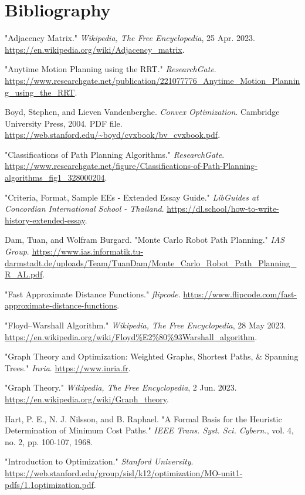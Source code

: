\documentclass[12pt]{article}
\begin{document}
\section{Bibliography}
\begin{enumerate}[label={[\arabic*]}]
    \item "Adjacency Matrix." \textit{Wikipedia, The Free Encyclopedia}, 25 Apr. 2023. \url{https://en.wikipedia.org/wiki/Adjacency_matrix}.
    \item "Anytime Motion Planning using the RRT." \textit{ResearchGate}. \url{https://www.researchgate.net/publication/221077776_Anytime_Motion_Planning_using_the_RRT}.
    \item Boyd, Stephen, and Lieven Vandenberghe. \textit{Convex Optimization}. Cambridge University Press, 2004. PDF file. \url{https://web.stanford.edu/~boyd/cvxbook/bv_cvxbook.pdf}.
    \item "Classifications of Path Planning Algorithms." \textit{ResearchGate}. \url{https://www.researchgate.net/figure/Classifications-of-Path-Planning-algorithms_fig1_328000204}.
    \item "Criteria, Format, Sample EEs - Extended Essay Guide." \textit{LibGuides at Concordian International School - Thailand}. \url{https://dl.school/how-to-write-history-extended-essay}.
    \item Dam, Tuan, and Wolfram Burgard. "Monte Carlo Robot Path Planning." \textit{IAS Group}. \url{https://www.ias.informatik.tu-darmstadt.de/uploads/Team/TuanDam/Monte_Carlo_Robot_Path_Planning_R_AL.pdf}.
    \item "Fast Approximate Distance Functions." \textit{flipcode}. \url{https://www.flipcode.com/fast-approximate-distance-functions}.
    \item "Floyd–Warshall Algorithm." \textit{Wikipedia, The Free Encyclopedia}, 28 May 2023. \url{https://en.wikipedia.org/wiki/Floyd%E2%80%93Warshall_algorithm}.
    \item "Graph Theory and Optimization: Weighted Graphs, Shortest Paths, & Spanning Trees." \textit{Inria}. \url{https://www.inria.fr}.
    \item "Graph Theory." \textit{Wikipedia, The Free Encyclopedia}, 2 Jun. 2023. \url{https://en.wikipedia.org/wiki/Graph_theory}.
    \item Hart, P. E., N. J. Nilsson, and B. Raphael. "A Formal Basis for the Heuristic Determination of Minimum Cost Paths." \textit{IEEE Trans. Syst. Sci. Cybern.}, vol. 4, no. 2, pp. 100-107, 1968.
    \item "Introduction to Optimization." \textit{Stanford University}. \url{https://web.stanford.edu/group/sisl/k12/optimization/MO-unit1-pdfs/1.1optimization.pdf}.

\end{enumerate}
\end{document}
